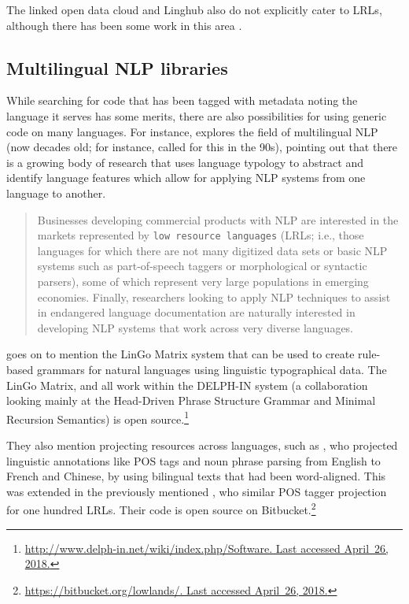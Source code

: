 The linked open data cloud and Linghub also do not explicitly cater to LRLs, although there has been some work in this area \citep{huang2017linking}.

\subsection{Multilingual NLP libraries}
\label{subsec:popular-open-source-libraries}

While searching for code that has been tagged with metadata noting the language it serves has some merits, there are also possibilities for using generic code on many languages. For instance, \citet{bender2016linguistic} explores the field of multilingual NLP (now decades old; for instance, \citet{kay1997proper} called for this in the 90s), pointing out that there is a growing body of research that uses language typology to abstract and identify language features which allow for applying NLP systems from one language to another.

\begin{quote}
Businesses developing commercial products with NLP are interested in the markets represented by {\tt low resource languages} (LRLs; i.e., those languages for which there are not many digitized data sets or basic NLP systems such as part-of-speech taggers or morphological or syntactic parsers), some of which represent very large populations in emerging economies. Finally, researchers looking to apply NLP techniques to assist in endangered language documentation are naturally interested in developing NLP systems that work across very diverse languages.\citep[646]{bender2016linguistic}
\end{quote}

\citet{bender2016linguistic} goes on to mention the LinGo Matrix system \citep{bender2002grammar, drellishak2005coordination} that can be used to create rule-based grammars for natural languages using linguistic typographical data. The LinGo Matrix, and all work within the DELPH-IN system (a collaboration looking mainly at the Head-Driven Phrase Structure Grammar and Minimal Recursion Semantics) is open source.\footnote{\href{http://www.delph-in.net/wiki/index.php/Software}{http://www.delph-in.net/wiki/index.php/Software. Last accessed April~26, 2018.}}

They also mention projecting resources across languages, such as \citet{yarowsky2001inducing}, who projected linguistic annotations like POS tags and noun phrase parsing from English to French and Chinese, by using bilingual texts that had been word-aligned. This was extended in the previously mentioned \citet{agic2015if}, who similar POS tagger projection for one hundred LRLs. Their code is open source on Bitbucket.\footnote{\href{https://bitbucket.org/lowlands/}{https://bitbucket.org/lowlands/. Last accessed April~26, 2018.}}

